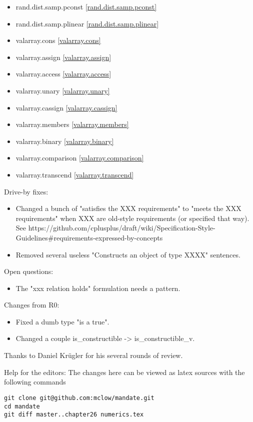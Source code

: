 \begin{multicols}{3}
\begin{itemize}
\item{rand.dist.samp.pconst}	\ref{rand.dist.samp.pconst}
\item{rand.dist.samp.plinear}	\ref{rand.dist.samp.plinear}
\item{valarray.cons}			\ref{valarray.cons}
\item{valarray.assign}			\ref{valarray.assign}
\item{valarray.access}			\ref{valarray.access}
\item{valarray.unary}			\ref{valarray.unary}
\item{valarray.cassign}			\ref{valarray.cassign}
\item{valarray.members}			\ref{valarray.members}
\item{valarray.binary}			\ref{valarray.binary}
\item{valarray.comparison}		\ref{valarray.comparison}
\item{valarray.transcend}		\ref{valarray.transcend}
\end{itemize}
\end{multicols}

Drive-by fixes:
\begin{itemize}
\item{Changed a bunch of "satisfies the XXX requirements" to "meets the XXX requirements" when XXX are old-style requirements (or specified that way). See https://github.com/cplusplus/draft/wiki/Specification-Style-Guidelines\#requirements-expressed-by-concepts}
\item{Removed several useless "Constructs an object of type XXXX" sentences.}
\end{itemize}

Open questions:
\begin{itemize}
\item{The "xxx relation holds" formulation needs a pattern.}
\end{itemize}


Changes from R0:
\begin{itemize}
\item{Fixed a dumb type "is a true".}
\item{Changed a couple is_constructible -> is_constructible_v.}
\end{itemize}

Thanks to Daniel Krügler for his several rounds of review.

\vfill
Help for the editors: The changes here can be viewed as latex sources with the following commands
\begin{verbatim}
git clone git@github.com:mclow/mandate.git
cd mandate
git diff master..chapter26 numerics.tex
\end{verbatim}
